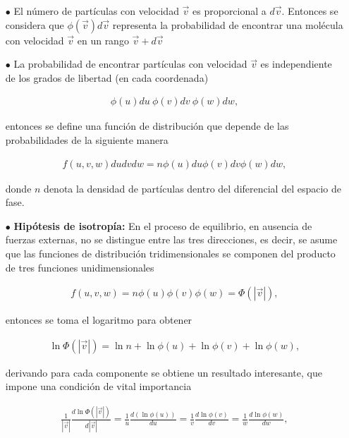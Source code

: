 \begin{itemize}
    \item[$\mathbf{\bullet}$] El número de partículas con velocidad $\vec{v}$ es proporcional a $d\vec{v}$. Entonces se considera que $\phi(\vec{v})d\vec{v}$ representa la probabilidad de encontrar una molécula con velocidad $\vec{v}$ en un rango $\vec{v} + d\vec{v}$
    
    \item[$\mathbf{\bullet}$] La probabilidad de encontrar partículas con velocidad $\vec{v}$ es independiente de los grados de libertad (en cada coordenada)

    \begin{eqnarray}
    \phi(u)du\ \phi(v)dv\ \phi(w)dw,
    \end{eqnarray}
    
    entonces se define una función de distribución que depende de las probabilidades de la siguiente manera
    
    \begin{eqnarray}
    f(u,v,w)dudvdw = n\phi(u)du\phi(v)dv\phi(w)dw,
    \end{eqnarray}
    
    donde $n$ denota la densidad de partículas dentro del diferencial del espacio de fase.
    
    \item[$\mathbf{\bullet}$] \textbf{Hipótesis de isotropía:} En el proceso de equilibrio, en ausencia de fuerzas externas, no se distingue entre las tres direcciones, es decir, se asume que las funciones de distribución tridimensionales se componen del producto de tres funciones unidimensionales
    
    \begin{eqnarray*}
    f(u,v,w) = n\phi(u)\phi(v)\phi(w) =\Phi(|\vec{v}|),
    \end{eqnarray*}
    
    entonces se toma el logaritmo para obtener
    
    \begin{eqnarray*}
    \ln \Phi(|\vec{v}|) = \ln n + \ln\phi(u)+\ln\phi(v)+\ln\phi(w),
    \end{eqnarray*}
    
    derivando para cada componente se obtiene un resultado interesante, que impone una condición de vital importancia
    
    
    \begin{eqnarray}
    \frac{1}{|\vec{v}|}\frac{d\ln\Phi(|\vec{v}|)}{d|\vec{v}|} = \frac{1}{u}\frac{d(\ln\phi(u))}{du}=\frac{1}{v}\frac{d\ln\phi(v)}{dv}=\frac{1}{w}\frac{d\ln\phi(w)}{dw},
    \end{eqnarray}
    

\end{itemize}
